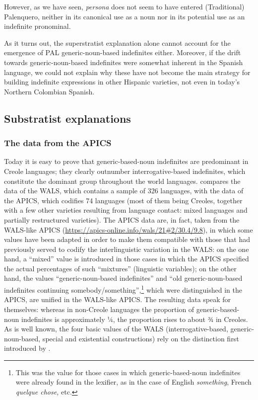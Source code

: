 \documentclass[output=paper,colorlinks,citecolor=brown]{langscibook}
\begin{document}
However, as we have seen, \textit{persona} does not seem to have entered (Traditional) Palenquero, neither in its canonical use as a noun nor in its potential use as an indefinite pronominal.

As it turns out, the superstratist explanation alone cannot account for the emergence of PAL generic-noun-based indefinites either. Moreover, if the drift towards generic-noun-based indefinites were somewhat inherent in the Spanish language, we could not explain why these have not become the main strategy for building indefinite expressions in other Hispanic varieties, not even in today’s Northern Colombian Spanish.

\subsection{Substratist explanations}\label{sec:gut3.3}\largerpage

\subsubsection{The data from the APICS}\label{sec:gut3.3.1}
\begin{sloppypar}
Today it is easy to prove that generic-based-noun indefinites are predominant in Creole languages; they clearly outnumber interrogative-based indefinites, which constitute the dominant group throughout the world languages.  compares the data of the WALS, which contains a sample of 326 languages, with the data of the APICS, which codifies 74 languages (most of them being Creoles, together with a few other varieties resulting from language contact: mixed languages and partially restructured varieties). The APICS data are, in fact, taken from the WALS-like APICS (\url{https://apics-online.info/wals/21#2/30.4/9.8}), in which some values have been adapted in order to make them compatible with those that had previously served to codify the interlinguistic variation in the WALS: on the one hand, a “mixed” value is introduced in those cases in which the APICS specified the actual percentages of such “mixtures” (linguistic variables); on the other hand, the values “generic-noun-based indefinites” and “old generic-noun-based indefinites continuing somebody/something”,\footnote{This was the value for those cases in which generic-based-noun indefinites were already found in the lexifier, as in the case of English \textit{something}, French \textit{quelque chose,} etc.} which were distinguished in the APICS, are unified in the WALS-like APICS. The resulting data speak for themselves: whereas in non-Creole languages the proportion of generic-based-noun indefinites is approximately ¼, the proportion rises to about ¾ in Creoles. As is well known, the four basic values of the WALS (interrogative-based, generic-noun-based, special and existential constructions) rely on the distinction first introduced by \citet{Haspelmath1997}.
\end{sloppypar}
\end{document}
